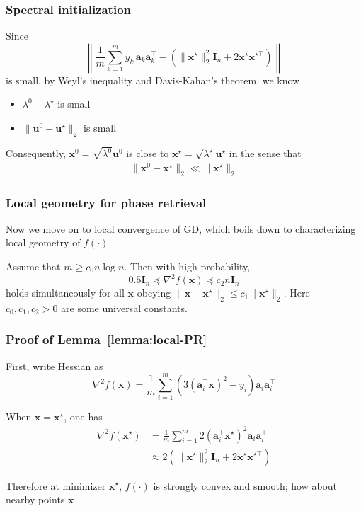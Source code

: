 \documentclass[compress,
mathserif,wide,%
]{beamer}
\begin{document}
\begin{frame}
	\frametitle{Spectral initialization}
	Since 
	\[
	\left \| \frac{1}{m}\sum_{k=1}^m y_k \,
		\bm{a}_k\bm{a}_k^{\top} - ( \| \bm{x}^\star \|_{2}^2 \bm{I}_{n} + 2 \bm{x}^\star \bm{x}^{\star \top} ) \right\|
	\]
	is small, by Weyl's inequality and Davis-Kahan's theorem, we know  
	\begin{itemize}
		\item $\lambda^0 - \lambda^\star$ is small
		\item $\| \bm{u}^0 - \bm{u}^\star \|_2$ is small
	\end{itemize}
	
	\vfill
	Consequently, $\bm{x}^0 = \sqrt{\lambda^0} \bm{u}^0 $ is close to $\bm{x}^\star = \sqrt{\lambda^\star} \bm{u}^\star$ in the sense that 
	\begin{align*}
		\| \bm{x}^0 - \bm{x}^\star \|_{2} \ll \| \bm{x}^\star \|_2
	\end{align*}
\end{frame}



\begin{frame}
	\frametitle{Local geometry for phase retrieval}
	Now we move on to local convergence of GD, which boils down to characterizing local geometry of $f(\cdot)$
	\vfill
	\begin{lemma}\label{lemma:local-PR}
		Assume that $m \geq c_{0} n \log n$. Then with high probability, 
		\[
		0.5 \bm{I}_{n} \preceq \nabla^2 f (\bm{x}) \preceq c_2 n  \bm{I}_{n} 
		\]
		holds simultaneously for all $\bm{x}$ obeying $\| \bm{x} - \bm{x}^\star \|_2 \leq c_1 \|\bm{x}^\star\|_{2}$. Here $c_0, c_1, c_2 > 0$ are some universal constants.
	\end{lemma}
\end{frame}

\begin{frame}
	\frametitle{Proof of Lemma~\ref{lemma:local-PR}}
	First, write Hessian as
	\[
	\nabla^2 f (\bm{x}) = \frac{1}{m} \sum_{i=1}^{m} ( 3 (\bm{a}_i^\top \bm{x} )^2 - y_i ) \bm{a}_i \bm{a}_i^\top
	\]
	
	When $\bm{x} = \bm{x}^\star$, one has 
	\begin{align*}
	\nabla^2 f (\bm{x}^\star) &= \frac{1}{m} \sum_{i=1}^{m} 2 (\bm{a}_i^\top \bm{x}^\star )^2 \bm{a}_i \bm{a}_i^\top \\
	& \approx 2 ( \| \bm{x}^\star \|_{2}^2 \bm{I}_{n} + 2 \bm{x}^\star \bm{x}^{\star \top}  )
	\end{align*}
	
	Therefore at minimizer $\bm{x}^\star$, $f(\cdot)$ is strongly convex and smooth; how about nearby points $\bm{x}$
\end{frame}
\end{document}
